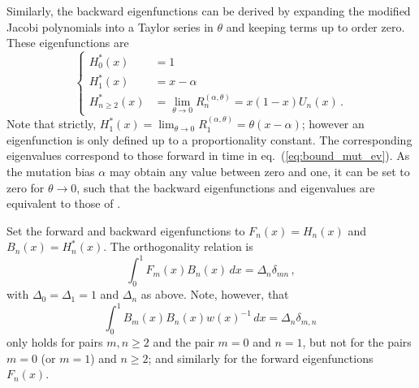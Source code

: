 \documentclass[preprint]{elsarticle}
\begin{document}
Similarly, the backward eigenfunctions can be derived by expanding the modified Jacobi polynomials into a Taylor series in $\theta$ and keeping terms up to order zero. These eigenfunctions are
\begin{equation}\label{eq:backw_Us}
\begin{cases}
    H_0^{*}(x)&=1\\
    H_1^{*}(x)&=x-\alpha\\
    H_{n\geq2}^{*}(x)&=\lim_{\theta\to0}R_n^{(\alpha,\theta)}=x(1-x)U_n(x)\,.
\end{cases}
\end{equation}
Note that strictly, $H_1^{*}(x)=\lim_{\theta\to0}R_1^{(\alpha,\theta)}=\theta(x-\alpha)$; however an eigenfunction is only defined up to a proportionality constant. The corresponding eigenvalues correspond to those forward in time in eq.~(\ref{eq:bound_mut_ev}).
As the mutation bias $\alpha$ may obtain any value between zero and one, it can be set to zero for $\theta\to0$, such that the backward eigenfunctions and eigenvalues are equivalent to those of \citet{Tran14b}. 

Set the forward and backward eigenfunctions to $F_n(x)=H_n(x)$ and $B_n(x)=H_n^*(x)$. The orthogonality relation is
\begin{equation}\label{eq:ortho_rel_pure_drift}
\int_0^1 F_m(x) B_n(x)\,dx=\Delta_n \delta_{mn}\,,
\end{equation}
with $\Delta_0=\Delta_1=1$ and $\Delta_n$ as above. Note, however, that 
\begin{equation}
\int_0^1 B_m(x) B_n(x) w(x)^{-1} \,dx=\Delta_n \delta_{m,n}\,
\end{equation}
only holds for pairs $m,n\geq 2$ and the pair $m=0$ and $n=1$, but not for the pairs $m=0$ (or $m=1$) and $n\geq 2$; and similarly for the forward eigenfunctions $F_n(x)$. %
\end{document}
